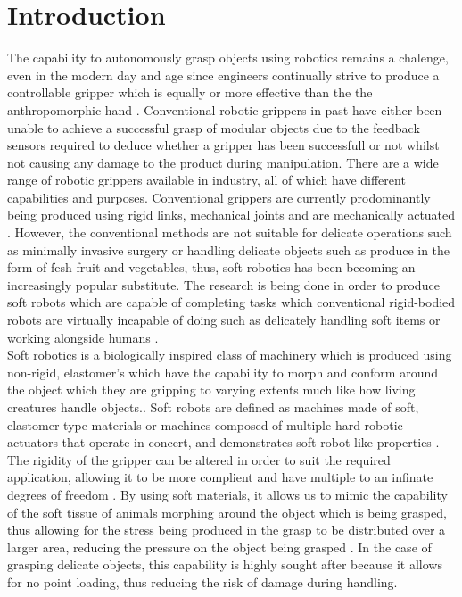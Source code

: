 \documentclass[11pt,twocolumn]{article}
\begin{document}
\section{Introduction}
The capability to autonomously grasp objects using robotics remains a chalenge, even in the modern day and age since engineers continually strive to produce a controllable gripper which is equally or more effective than the the anthropomorphic hand \cite{bogue2016flexible}. Conventional robotic grippers in past have either been unable to achieve a successful grasp of modular objects due to the feedback sensors required to deduce whether a gripper has been successfull or not whilst not causing any damage to the product during manipulation. There are a wide range of robotic grippers available in industry, all of which have different capabilities and purposes. Conventional grippers are currently prodominantly being produced using rigid links, mechanical joints and are mechanically actuated \cite{ilievski2011soft}. However, the conventional methods are not suitable for delicate operations such as minimally invasive surgery or handling delicate objects such as produce in the form of fesh fruit and vegetables, thus, soft robotics has been becoming an increasingly popular substitute. The research is being done in order to produce soft robots which are capable of completing tasks which conventional rigid-bodied robots are virtually incapable of doing such as delicately handling soft items or working alongside humans \cite{bilodeau2015monolithic}.
\\
\newline
Soft robotics is a biologically inspired class of machinery which is produced using non-rigid, elastomer's which have the capability to morph and conform around the object which they are gripping to varying extents much like how living creatures handle objects.\cite{ilievski2011soft,bilodeau2015monolithic,mosadegh2014pneumatic,martinez2013robotic,marchese2015recipe}. Soft robots are defined as machines made of soft, elastomer type materials or machines composed of multiple hard-robotic actuators that operate in concert, and demonstrates soft-robot-like properties \cite{ilievski2011soft}. The rigidity of the gripper can be altered in order to suit the required application, allowing it to be more complient and have multiple to an infinate degrees of freedom \cite{hassan2015design}. By using soft materials, it allows us to mimic the capability of the soft tissue of animals morphing around the object which is being grasped, thus allowing for the stress being produced in the grasp to be distributed over a larger area, reducing the pressure on the object being grasped \cite{ilievski2011soft}. In the case of grasping delicate objects, this capability is highly sought after because it allows for no point loading, thus reducing the risk of damage  during handling.
\end{document}
